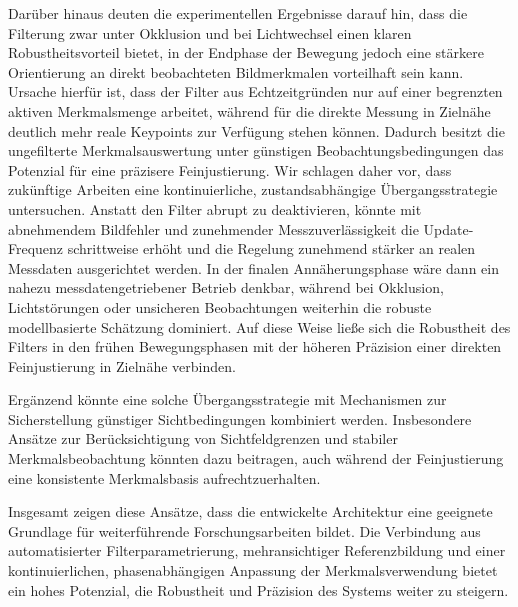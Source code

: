 Darüber hinaus deuten die experimentellen Ergebnisse darauf hin, dass die Filterung zwar unter Okklusion und bei Lichtwechsel einen klaren Robustheitsvorteil bietet, in der Endphase der Bewegung jedoch eine stärkere Orientierung an direkt beobachteten Bildmerkmalen vorteilhaft sein kann. Ursache hierfür ist, dass der Filter aus Echtzeitgründen nur auf einer begrenzten aktiven Merkmalsmenge arbeitet, während für die direkte Messung in Zielnähe deutlich mehr reale Keypoints zur Verfügung stehen können. Dadurch besitzt die ungefilterte Merkmalsauswertung unter günstigen Beobachtungsbedingungen das Potenzial für eine präzisere Feinjustierung. Wir schlagen daher vor, dass zukünftige Arbeiten eine kontinuierliche, zustandsabhängige Übergangsstrategie untersuchen. Anstatt den Filter abrupt zu deaktivieren, könnte mit abnehmendem Bildfehler und zunehmender Messzuverlässigkeit die Update-Frequenz schrittweise erhöht und die Regelung zunehmend stärker an realen Messdaten ausgerichtet werden. In der finalen Annäherungsphase wäre dann ein nahezu messdatengetriebener Betrieb denkbar, während bei Okklusion, Lichtstörungen oder unsicheren Beobachtungen weiterhin die robuste modellbasierte Schätzung dominiert. Auf diese Weise ließe sich die Robustheit des Filters in den frühen Bewegungsphasen mit der höheren Präzision einer direkten Feinjustierung in Zielnähe verbinden.

Ergänzend könnte eine solche Übergangsstrategie mit Mechanismen zur Sicherstellung günstiger Sichtbedingungen kombiniert werden. Insbesondere Ansätze zur Berücksichtigung von Sichtfeldgrenzen und stabiler Merkmalsbeobachtung könnten dazu beitragen, auch während der Feinjustierung eine konsistente Merkmalsbasis aufrechtzuerhalten.

Insgesamt zeigen diese Ansätze, dass die entwickelte Architektur eine geeignete Grundlage für weiterführende Forschungsarbeiten bildet. Die Verbindung aus automatisierter Filterparametrierung, mehransichtiger Referenzbildung und einer kontinuierlichen, phasenabhängigen Anpassung der Merkmalsverwendung bietet ein hohes Potenzial, die Robustheit und Präzision des Systems weiter zu steigern.